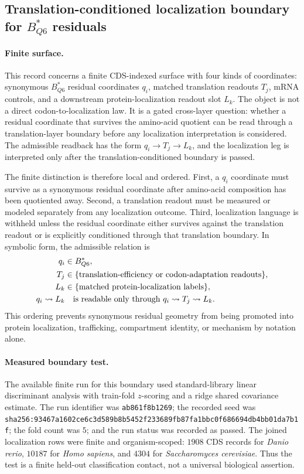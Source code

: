 \subsection{Translation-conditioned localization boundary for $B^{\ast}_{Q6}$ residuals}
\label{sec:q6-translation-conditioned-protein-localization-boundary-cross-layer}

\paragraph{Finite surface.}
This record concerns a finite CDS-indexed surface with four kinds of coordinates: synonymous $B^{\ast}_{Q6}$ residual coordinates $q_i$, matched translation readouts $T_j$, mRNA controls, and a downstream protein-localization readout slot $L_k$. The object is not a direct codon-to-localization law. It is a gated cross-layer question: whether a residual coordinate that survives the amino-acid quotient can be read through a translation-layer boundary before any localization interpretation is considered. The admissible readback has the form $q_i \to T_j \to L_k$, and the localization leg is interpreted only after the translation-conditioned boundary is passed.

The finite distinction is therefore local and ordered. First, a $q_i$ coordinate must survive as a synonymous residual coordinate after amino-acid composition has been quotiented away. Second, a translation readout must be measured or modeled separately from any localization outcome. Third, localization language is withheld unless the residual coordinate either survives against the translation readout or is explicitly conditioned through that translation boundary. In symbolic form, the admissible relation is
$$
\begin{aligned}
q_i &\in B^{\ast}_{Q6},\\
T_j &\in \{\hbox{translation-efficiency or codon-adaptation readouts}\},\\
L_k &\in \{\hbox{matched protein-localization labels}\},\\
q_i \leadsto L_k &\quad \hbox{is readable only through } q_i \leadsto T_j \leadsto L_k.
\end{aligned}
$$
This ordering prevents synonymous residual geometry from being promoted into protein localization, trafficking, compartment identity, or mechanism by notation alone.

\paragraph{Measured boundary test.}
The available finite run for this boundary used standard-library linear discriminant analysis with train-fold $z$-scoring and a ridge shared covariance estimate. The run identifier was \texttt{ab861f8b1269}; the recorded seed was \texttt{sha256:93467a1602ce6c3d589b8b5452f233689fb87fa1bbc0f686694db4bb01da7b1f}; the fold count was $5$; and the run status was recorded as passed. The joined localization rows were finite and organism-scoped: $1908$ CDS records for \emph{Danio rerio}, $10187$ for \emph{Homo sapiens}, and $4304$ for \emph{Saccharomyces cerevisiae}. Thus the test is a finite held-out classification contact, not a universal biological assertion.

